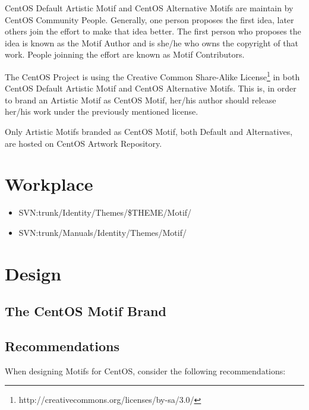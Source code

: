 \documentclass{article}
\begin{document}
CentOS Default Artistic Motif and CentOS Alternative Motifs are
maintain by CentOS Community People. Generally, one person proposes
the first idea, later others join the effort to make that idea better.
The first person who proposes the idea is known as the Motif Author
and is she/he who owns the copyright of that work. People joinning the
effort are known as Motif Contributors. 

The CentOS Project is using the Creative Common Share-Alike
License\footnote{http://creativecommons.org/licenses/by-sa/3.0/} in
both CentOS Default Artistic Motif and CentOS Alternative Motifs. This
is, in order to brand an Artistic Motif as CentOS Motif, her/his
author should release her/his work under the previously mentioned
license. 

Only Artistic Motifs branded as CentOS Motif, both Default and
Alternatives, are hosted on CentOS Artwork Repository.

\section{Workplace}

\begin{itemize}
\item SVN:trunk/Identity/Themes/\$THEME/Motif/
\item SVN:trunk/Manuals/Identity/Themes/Motif/
\end{itemize}

\section{Design}

\subsection{The CentOS Motif Brand}

\subsection{Recommendations}

When designing Motifs for CentOS, consider the following
recommendations:
\end{document}
